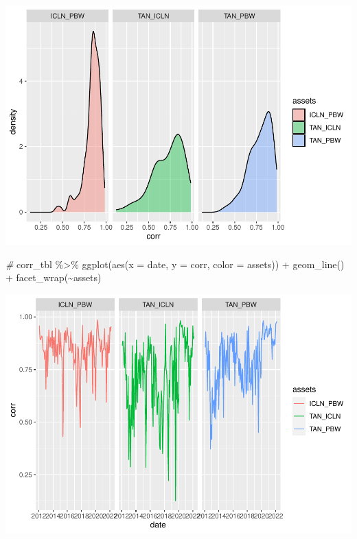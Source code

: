 \documentclass{article}
\newenvironment{Shaded}{\begin{snugshade}}{\end{snugshade}}
\newcommand{\AttributeTok}[1]{\textcolor[rgb]{0.77,0.63,0.00}{#1}}
\newcommand{\CommentTok}[1]{\textcolor[rgb]{0.56,0.35,0.01}{\textit{#1}}}
\newcommand{\FunctionTok}[1]{\textcolor[rgb]{0.00,0.00,0.00}{#1}}
\newcommand{\NormalTok}[1]{#1}
\newcommand{\SpecialCharTok}[1]{\textcolor[rgb]{0.00,0.00,0.00}{#1}}
\begin{document}
\includegraphics{market-facts_files/figure-latex/explorecorr-1.pdf}

\begin{Shaded}
\begin{Highlighting}[]
\CommentTok{\#}
\NormalTok{corr\_tbl }\SpecialCharTok{\%\textgreater{}\%} \FunctionTok{ggplot}\NormalTok{(}\FunctionTok{aes}\NormalTok{(}\AttributeTok{x =}\NormalTok{ date, }\AttributeTok{y =}\NormalTok{ corr, }\AttributeTok{color =}\NormalTok{ assets)) }\SpecialCharTok{+}
  \FunctionTok{geom\_line}\NormalTok{() }\SpecialCharTok{+} 
  \FunctionTok{facet\_wrap}\NormalTok{(}\SpecialCharTok{\textasciitilde{}}\NormalTok{assets)}
\end{Highlighting}
\end{Shaded}

\includegraphics{market-facts_files/figure-latex/explorecorr-2.pdf}
\end{document}
